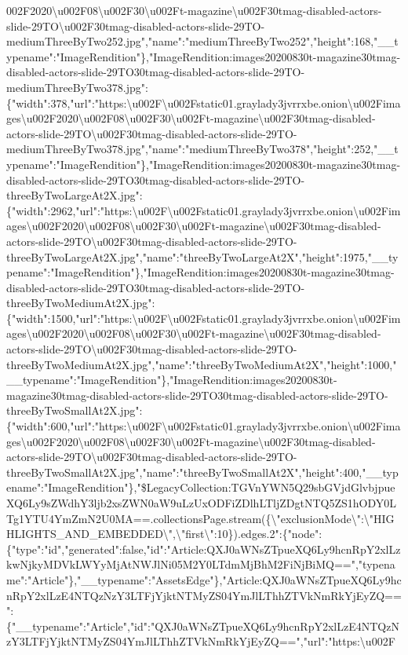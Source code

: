 002F2020\textbackslash{}u002F08\textbackslash{}u002F30\textbackslash{}u002Ft-magazine\textbackslash{}u002F30tmag-disabled-actors-slide-29TO\textbackslash{}u002F30tmag-disabled-actors-slide-29TO-mediumThreeByTwo252.jpg","name":"mediumThreeByTwo252","height":168,"\_\_typename":"ImageRendition"\},"ImageRendition:images20200830t-magazine30tmag-disabled-actors-slide-29TO30tmag-disabled-actors-slide-29TO-mediumThreeByTwo378.jpg":\{"width":378,"url":"https:\textbackslash{}u002F\textbackslash{}u002Fstatic01.graylady3jvrrxbe.onion\textbackslash{}u002Fimages\textbackslash{}u002F2020\textbackslash{}u002F08\textbackslash{}u002F30\textbackslash{}u002Ft-magazine\textbackslash{}u002F30tmag-disabled-actors-slide-29TO\textbackslash{}u002F30tmag-disabled-actors-slide-29TO-mediumThreeByTwo378.jpg","name":"mediumThreeByTwo378","height":252,"\_\_typename":"ImageRendition"\},"ImageRendition:images20200830t-magazine30tmag-disabled-actors-slide-29TO30tmag-disabled-actors-slide-29TO-threeByTwoLargeAt2X.jpg":\{"width":2962,"url":"https:\textbackslash{}u002F\textbackslash{}u002Fstatic01.graylady3jvrrxbe.onion\textbackslash{}u002Fimages\textbackslash{}u002F2020\textbackslash{}u002F08\textbackslash{}u002F30\textbackslash{}u002Ft-magazine\textbackslash{}u002F30tmag-disabled-actors-slide-29TO\textbackslash{}u002F30tmag-disabled-actors-slide-29TO-threeByTwoLargeAt2X.jpg","name":"threeByTwoLargeAt2X","height":1975,"\_\_typename":"ImageRendition"\},"ImageRendition:images20200830t-magazine30tmag-disabled-actors-slide-29TO30tmag-disabled-actors-slide-29TO-threeByTwoMediumAt2X.jpg":\{"width":1500,"url":"https:\textbackslash{}u002F\textbackslash{}u002Fstatic01.graylady3jvrrxbe.onion\textbackslash{}u002Fimages\textbackslash{}u002F2020\textbackslash{}u002F08\textbackslash{}u002F30\textbackslash{}u002Ft-magazine\textbackslash{}u002F30tmag-disabled-actors-slide-29TO\textbackslash{}u002F30tmag-disabled-actors-slide-29TO-threeByTwoMediumAt2X.jpg","name":"threeByTwoMediumAt2X","height":1000,"\_\_typename":"ImageRendition"\},"ImageRendition:images20200830t-magazine30tmag-disabled-actors-slide-29TO30tmag-disabled-actors-slide-29TO-threeByTwoSmallAt2X.jpg":\{"width":600,"url":"https:\textbackslash{}u002F\textbackslash{}u002Fstatic01.graylady3jvrrxbe.onion\textbackslash{}u002Fimages\textbackslash{}u002F2020\textbackslash{}u002F08\textbackslash{}u002F30\textbackslash{}u002Ft-magazine\textbackslash{}u002F30tmag-disabled-actors-slide-29TO\textbackslash{}u002F30tmag-disabled-actors-slide-29TO-threeByTwoSmallAt2X.jpg","name":"threeByTwoSmallAt2X","height":400,"\_\_typename":"ImageRendition"\},"\$LegacyCollection:TGVnYWN5Q29sbGVjdGlvbjpueXQ6Ly9sZWdhY3ljb2xsZWN0aW9uLzUxODFiZDlhLTljZDgtNTQ5ZS1hODY0LTg1YTU4YmZmN2U0MA==.collectionsPage.stream(\{\textbackslash{}"exclusionMode\textbackslash{}":\textbackslash{}"HIGHLIGHTS\_AND\_EMBEDDED\textbackslash{}",\textbackslash{}"first\textbackslash{}":10\}).edges.2":\{"node":\{"type":"id","generated":false,"id":"Article:QXJ0aWNsZTpueXQ6Ly9hcnRpY2xlLzkwNjkyMDVkLWYyMjAtNWJlNi05M2Y0LTdmMjBhM2FiNjBiMQ==","typename":"Article"\},"\_\_typename":"AssetsEdge"\},"Article:QXJ0aWNsZTpueXQ6Ly9hcnRpY2xlLzE4NTQzNzY3LTFjYjktNTMyZS04YmJlLThhZTVkNmRkYjEyZQ==":\{"\_\_typename":"Article","id":"QXJ0aWNsZTpueXQ6Ly9hcnRpY2xlLzE4NTQzNzY3LTFjYjktNTMyZS04YmJlLThhZTVkNmRkYjEyZQ==","url":"https:\textbackslash{}u002F\textba